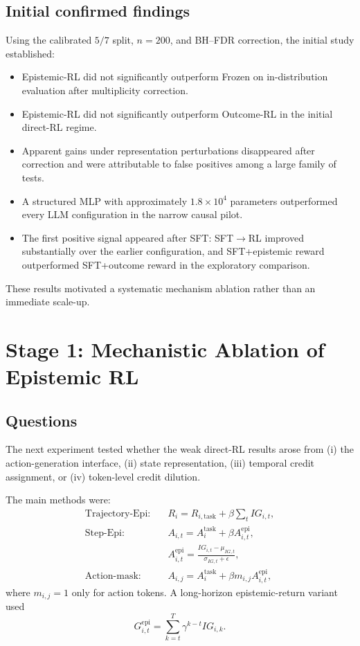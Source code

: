 \documentclass[11pt]{article}
\begin{document}
\subsection{Initial confirmed findings}
Using the calibrated $5/7$ split, $n=200$, and BH--FDR correction, the initial study established:
\begin{itemize}
    \item Epistemic-RL did not significantly outperform Frozen on in-distribution evaluation after multiplicity correction.
    \item Epistemic-RL did not significantly outperform Outcome-RL in the initial direct-RL regime.
    \item Apparent gains under representation perturbations disappeared after correction and were attributable to false positives among a large family of tests.
    \item A structured MLP with approximately $1.8\times10^4$ parameters outperformed every LLM configuration in the narrow causal pilot.
    \item The first positive signal appeared after SFT: SFT$\rightarrow$RL improved substantially over the earlier configuration, and SFT+epistemic reward outperformed SFT+outcome reward in the exploratory comparison.
\end{itemize}
These results motivated a systematic mechanism ablation rather than an immediate scale-up.

\section{Stage 1: Mechanistic Ablation of Epistemic RL}
\subsection{Questions}
The next experiment tested whether the weak direct-RL results arose from (i) the action-generation interface, (ii) state representation, (iii) temporal credit assignment, or (iv) token-level credit dilution.

The main methods were:
\begin{align*}
\text{Trajectory-Epi:}\quad
&R_i=R_{i,\mathrm{task}}+\beta\sum_t IG_{i,t},\\
\text{Step-Epi:}\quad
&A_{i,t}=A_i^{\mathrm{task}}+\beta A_{i,t}^{\mathrm{epi}},\\
&A_{i,t}^{\mathrm{epi}}=\frac{IG_{i,t}-\mu_{IG,t}}{\sigma_{IG,t}+\epsilon},\\
\text{Action-mask:}\quad
&A_{i,j}=A_i^{\mathrm{task}}+\beta m_{i,j}A_{i,t}^{\mathrm{epi}},
\end{align*}
where $m_{i,j}=1$ only for action tokens. A long-horizon epistemic-return variant used
\[
G_{i,t}^{\mathrm{epi}}=\sum_{k=t}^{T}\gamma^{k-t}IG_{i,k}.
\]
\end{document}
